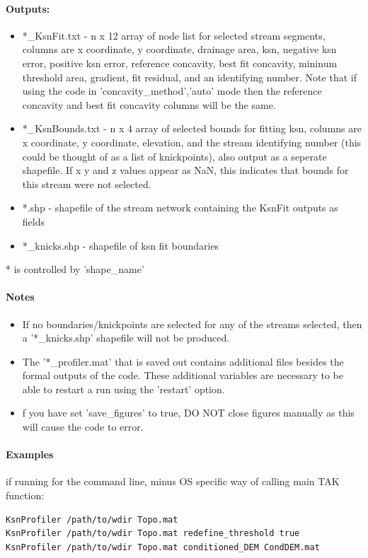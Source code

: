 \paragraph{Outputs:}
\begin{itemize}
\item *\_KsnFit.txt - n x 12 array of node list for selected stream segments, columns are x coordinate, y coordinate, drainage area, ksn, negative ksn error,
positive ksn error, reference concavity, best fit concavity, mininum threshold area, gradient, fit residual, and an identifying number. Note
that if using the code in 'concavity\_method','auto' mode then the reference concavity and best fit concavity columns will be the same.
\item *\_KsnBounds.txt - n x 4 array of selected bounds for fitting ksn, columns are x coordinate, y coordinate, elevation, and the stream identifying number 
(this could be thought of as a list of knickpoints), also output as a seperate shapefile. If x y and z values appear as NaN, this indicates
that bounds for this stream were not selected. 
\item *.shp - shapefile of the stream network containing the KsnFit outputs as fields
\item *\_knicks.shp - shapefile of ksn fit boundaries
\end{itemize}
* is controlled by 'shape\_name'

\paragraph{Notes}
\begin{itemize}
\item If no boundaries/knickpoints are selected for any of the streams selected, then a '*\_knicks.shp' shapefile will not be produced.
\item The '*\_profiler.mat' that is saved out contains additional files besides the formal outputs of the code. These additional variables
are necessary to be able to restart a run using the 'restart' option.
\item f you have set 'save\_figures' to true, DO NOT close figures manually as this will cause the code to error.
\end{itemize}

\paragraph{Examples} if running for the command line, minus OS specific way of calling main TAK function:
\begin{lstlisting}[language=bash]
KsnProfiler /path/to/wdir Topo.mat
KsnProfiler /path/to/wdir Topo.mat redefine_threshold true 
KsnProfiler /path/to/wdir Topo.mat conditioned_DEM CondDEM.mat
\end{lstlisting}


